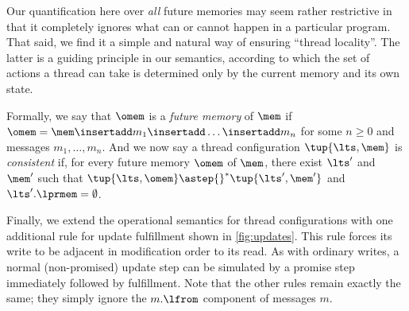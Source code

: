 
\figupdates

Our quantification here over \emph{all} future memories may seem
rather restrictive in that it completely ignores what can or cannot
happen in a particular program.  That said, we find it a simple and
natural way of ensuring ``thread locality''.  The latter is a guiding
principle in our semantics, according to which the set of actions a
thread can take is determined only by the current memory and its own
state.

Formally, we say that $\omem$ is a \emph{future memory} of $\mem$ if
${\omem = \mem \insertadd m_1 \insertadd \ldots \insertadd m_n}$
for some $n\geq 0$ and messages $m_1,\ldots,m_n$. And
we now say a thread configuration $\tup{\lts,\mem}$ is
\emph{consistent} if, for every future memory $\omem$ of $\mem$, there
exist $\lts'$ and $\mem'$ such that $\tup{\lts,\omem} \astep{}^* \tup{\lts',\mem'}$
and $\lts'.\lprmem = \emptyset$.

Finally, we extend the operational semantics for thread configurations
with one additional rule for update fulfillment shown in
\cref{fig:updates}.  This rule forces its write to be adjacent in
modification order to its read.  As with ordinary writes, a normal
(non-promised) update step can be simulated by a promise step
immediately followed by fulfillment.  Note that the other rules remain
exactly the same; they simply ignore the $m.\lfrom$ component of
messages $m$.




